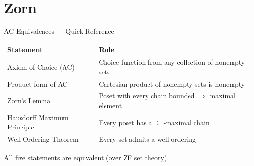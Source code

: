 \section{Zorn}


\begin{toolkitbox}{AC Equivalences — Quick Reference}
\small
\begin{tabular}{l l}
\toprule
\textbf{Statement} & \textbf{Role} \\
\midrule
Axiom of Choice (AC)         & Choice function from any collection of nonempty sets \\
Product form of AC           & Cartesian product of nonempty sets is nonempty \\
Zorn's Lemma                 & Poset with every chain bounded $\Rightarrow$ maximal element \\
Hausdorff Maximum Principle  & Every poset has a $\subseteq$-maximal chain \\
Well-Ordering Theorem        & Every set admits a well-ordering \\
\bottomrule
\end{tabular}

\medskip
All five statements are equivalent (over ZF set theory).
\end{toolkitbox}


